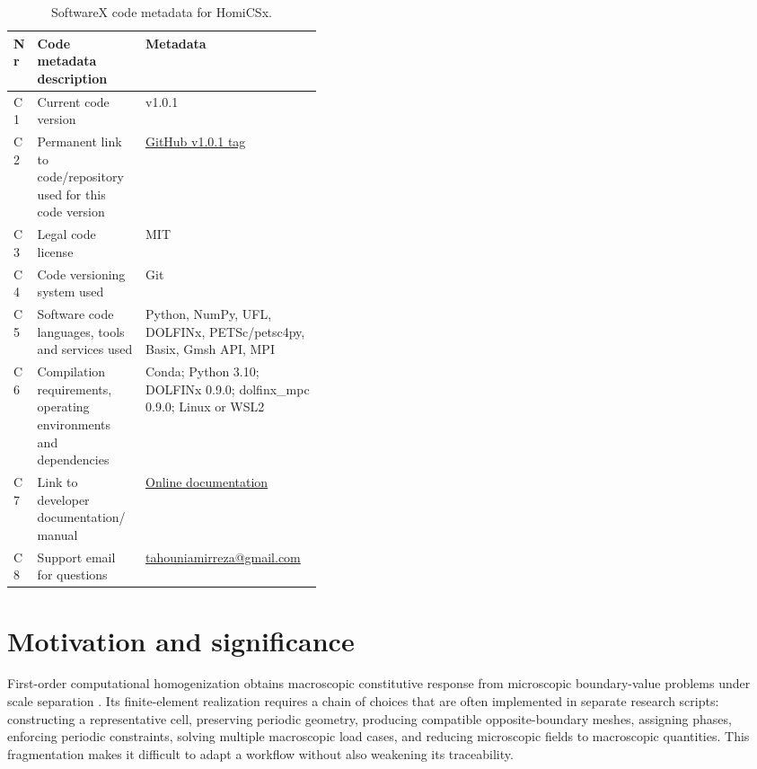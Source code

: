 \documentclass[preprint,12pt]{elsarticle}
\begin{document}
\begin{table}[htbp]
\centering
\small
\begin{tabularx}{\linewidth}{@{}>{\raggedright\arraybackslash}p{0.05\linewidth}>{\raggedright\arraybackslash}p{0.35\linewidth}>{\raggedright\arraybackslash}X@{}}
\toprule
Nr & Code metadata description & Metadata \\
\midrule
C1 & Current code version & v1.0.1 \\
C2 & Permanent link to code/repository used for this code version &
\href{https://github.com/AmirTahouni/HomiCSx/tree/v1.0.1}{GitHub v1.0.1 tag} \\
C3 & Legal code license & MIT \\
C4 & Code versioning system used & Git \\
C5 & Software code languages, tools and services used & Python, NumPy, UFL,
DOLFINx, PETSc/petsc4py, Basix, Gmsh API, MPI \\
C6 & Compilation requirements, operating environments and dependencies &
Conda; Python 3.10; DOLFINx 0.9.0; dolfinx\_mpc 0.9.0; Linux or WSL2 \\
C7 & Link to developer documentation/manual &
\href{https://homicsx.readthedocs.io/en/latest/}{Online documentation} \\
C8 & Support email for questions &
\href{mailto:tahouniamirreza@gmail.com}{tahouniamirreza@gmail.com} \\
\bottomrule
\end{tabularx}
\caption{SoftwareX code metadata for HomiCSx.}
\label{tab:metadata}
\end{table}

\section{Motivation and significance}

First-order computational homogenization obtains macroscopic constitutive
response from microscopic boundary-value problems under scale separation
\cite{geers2003,saeb2016}. Its finite-element realization requires a chain of
choices that are often implemented in separate research scripts: constructing
a representative cell, preserving periodic geometry, producing compatible
opposite-boundary meshes, assigning phases, enforcing periodic constraints,
solving multiple macroscopic load cases, and reducing microscopic fields to
macroscopic quantities. This fragmentation makes it difficult to adapt a
workflow without also weakening its traceability.
\end{document}
